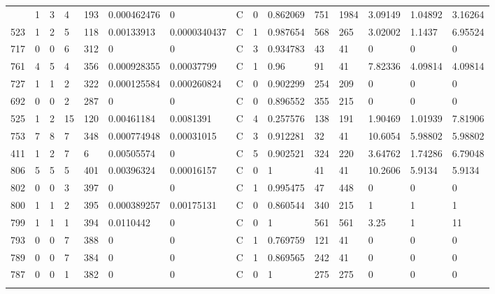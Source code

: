 \begin{latin}
\begin{longtable}{lllllllllllllll}
\begin{comment}
	598 & 1  & 3   & 4  & 193 & 0.000462476    & 0              & C & 0  & 0.862069 & 751  & 1984 & 3.09149 & 1.04892 & 3.16264 \\
	523 & 1  & 2   & 5  & 118 & 0.00133913     & 0.0000340437   & C & 1  & 0.987654 & 568  & 265  & 3.02002 & 1.1437  & 6.95524 \\
	717 & 0  & 0   & 6  & 312 & 0              & 0              & C & 3  & 0.934783 & 43   & 41   & 0       & 0       & 0       \\
	761 & 4  & 5   & 4  & 356 & 0.000928355    & 0.00037799     & C & 1  & 0.96     & 91   & 41   & 7.82336 & 4.09814 & 4.09814 \\
	727 & 1  & 1   & 2  & 322 & 0.000125584    & 0.000260824    & C & 0  & 0.902299 & 254  & 209  & 0       & 0       & 0       \\
	692 & 0  & 0   & 2  & 287 & 0              & 0              & C & 0  & 0.896552 & 355  & 215  & 0       & 0       & 0       \\
	525 & 1  & 2   & 15 & 120 & 0.00461184     & 0.0081391      & C & 4  & 0.257576 & 138  & 191  & 1.90469 & 1.01939 & 7.81906 \\
	753 & 7  & 8   & 7  & 348 & 0.000774948    & 0.00031015     & C & 3  & 0.912281 & 32   & 41   & 10.6054 & 5.98802 & 5.98802 \\
	411 & 1  & 2   & 7  & 6   & 0.00505574     & 0              & C & 5  & 0.902521 & 324  & 220  & 3.64762 & 1.74286 & 6.79048 \\
	806 & 5  & 5   & 5  & 401 & 0.00396324     & 0.00016157     & C & 0  & 1        & 41   & 41   & 10.2606 & 5.9134  & 5.9134  \\
	802 & 0  & 0   & 3  & 397 & 0              & 0              & C & 1  & 0.995475 & 47   & 448  & 0       & 0       & 0       \\
	800 & 1  & 1   & 2  & 395 & 0.000389257    & 0.00175131     & C & 0  & 0.860544 & 340  & 215  & 1       & 1       & 1       \\
	799 & 1  & 1   & 1  & 394 & 0.0110442      & 0              & C & 0  & 1        & 561  & 561  & 3.25    & 1       & 11      \\
	793 & 0  & 0   & 7  & 388 & 0              & 0              & C & 1  & 0.769759 & 121  & 41   & 0       & 0       & 0       \\
	789 & 0  & 0   & 7  & 384 & 0              & 0              & C & 1  & 0.869565 & 242  & 41   & 0       & 0       & 0       \\
	787 & 0  & 0   & 1  & 382 & 0              & 0              & C & 0  & 1        & 275  & 275  & 0       & 0       & 0       \\

\end{comment}
\end{longtable}
\end{latin}
